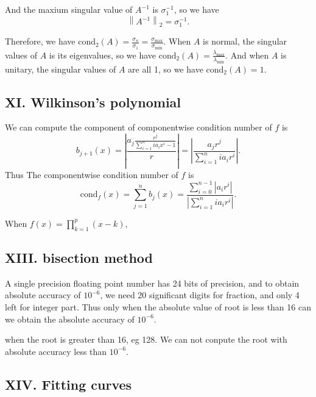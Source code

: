 \documentclass[a4paper]{article}
\newcommand{\abs}[1]{\left|#1\right|}
\newcommand{\normtwo}[1]{\left\|#1\right\|_2}
\begin{document}
And the maxium singular value of $A^{-1}$ is $\sigma_1^{-1}$, so we have
\[
  \normtwo{A^{-1}} = \sigma_1^{-1}.
\]

Therefore, we have $\text{cond}_2(A) = \frac{\sigma_n}{\sigma_1} = \frac{\sigma_{\max}}{\sigma_{\min}}$. When $A$ is normal, the singular values of $A$ is its eigenvalues, so we have $\text{cond}_2(A) = \frac{\lambda_{\max}}{\lambda_{\min}}$. And when $A$ is unitary, the singular values of $A$ are all 1, so we have $\text{cond}_2(A) = 1$.
\subsection*{XI. Wilkinson's polynomial}
We can compute the component of componentwise condition number of $f$ is\[
b_{j+1}(x) = \abs{\frac{a_j\frac{r^j}{\sum_{i =1}^{n}ia_ix^i-1}}{r}}=\abs{\frac{a_jr^j}{\sum_{i =1}^{n}ia_ir^i}}.
\]  
Thus The componentwise condition number of $f$ is \[
\text{cond}_{f}(x) = \sum_{j=1}^{n}b_{j}(x) = \dfrac{\sum_{i = 0}^{n-1}\abs{a_i r^i}}{\abs{\sum_{i =1}^{n}ia_ir^i}}.
\]

When $f(x) = \prod_{k=1}^{p}(x-k)$, 

\subsection*{XIII. bisection method}
A single precision floating point number has 24 bits of precision, and to obtain absolute accuracy of $10^{-6}$, we need 20 significant digits for fraction, and only 4 left for integer part. Thus only when the absolute value of root is less than 16 can we obtain the absolute accuracy of $10^{-6}$.

when the root is greater than 16, eg 128. We can not conpute the root with absolute accuracy less than $10^{-6}$.

\subsection*{XIV. Fitting curves}
\end{document}
